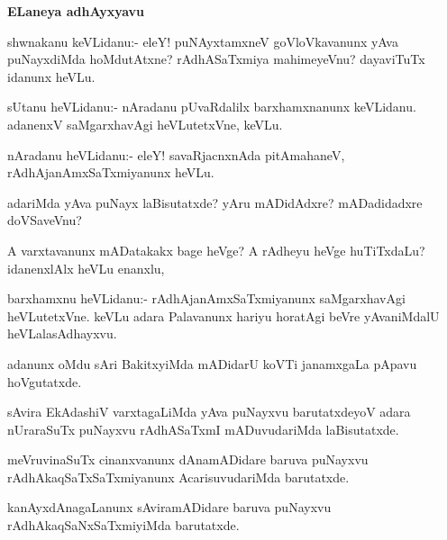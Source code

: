 \begin{center}
\textbf{\large ELaneya adhAyxyavu}
\end{center}

\begin{mng}
shwnakanu keVLidanu:- eleY! puNAyxtamxneV goVloVkavanunx yAva puNayxdiMda hoMdutAtxne? rAdhASaTxmiya mahimeyeVnu? dayaviTuTx idanunx heVLu.
\end{mng}

\begin{mng}
sUtanu heVLidanu:- nAradanu pUvaRdalilx barxhamxnanunx keVLidanu. adanenxV saMgarxhavAgi heVLutetxVne, keVLu.
\end{mng}

\begin{mng}
nAradanu heVLidanu:- eleY! savaRjacnxnAda pitAmahaneV, rAdhAjanAmxSaTxmiyanunx heVLu.
\end{mng}

\begin{mng}
adariMda yAva puNayx laBisutatxde? yAru mADidAdxre? mADadidadxre doVSaveVnu?
\end{mng}

\begin{mng}
A varxtavanunx mADatakakx bage heVge? A rAdheyu heVge huTiTxdaLu? idanenxlAlx heVLu enanxlu,
\end{mng}

\begin{mng}
barxhamxnu heVLidanu:- rAdhAjanAmxSaTxmiyanunx saMgarxhavAgi heVLutetxVne. keVLu adara Palavanunx hariyu horatAgi beVre yAvaniMdalU heVLalasAdhayxvu.
\end{mng}

\begin{mng}
adanunx oMdu sAri BakitxyiMda mADidarU koVTi janamxgaLa pApavu hoVgutatxde.
\end{mng}

\begin{mng}
sAvira EkAdashiV varxtagaLiMda yAva puNayxvu barutatxdeyoV adara nUraraSuTx puNayxvu rAdhASaTxmI mADuvudariMda laBisutatxde.
\end{mng}

\begin{mng}
meVruvinaSuTx cinanxvanunx dAnamADidare baruva puNayxvu rAdhAkaqSaTxSaTxmiyanunx AcarisuvudariMda barutatxde.
\end{mng}

\begin{mng}
kanAyxdAnagaLanunx sAviramADidare baruva puNayxvu rAdhAkaqSaNxSaTxmiyiMda barutatxde.
\end{mng}

